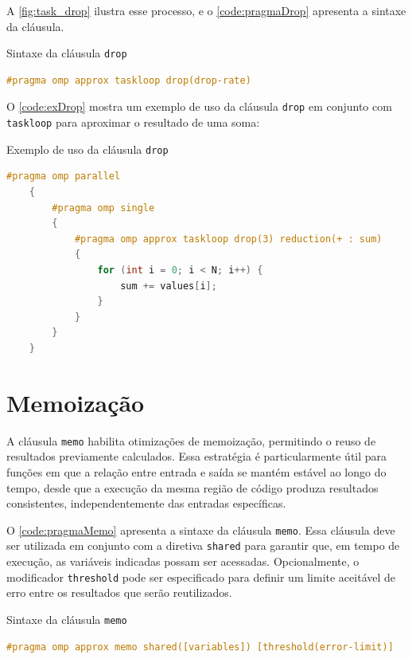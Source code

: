 A \autoref{fig:task_drop} ilustra esse processo, e o \autoref{code:pragmaDrop} apresenta a sintaxe da cláusula.

\begin{sourcecode}[htb]
    \caption{\label{code:pragmaDrop}Sintaxe da cláusula \texttt{drop}}
    \begin{lstlisting}[frame=single, language=C++]
        #pragma omp approx taskloop drop(drop-rate)
    \end{lstlisting}
    \fonte{}
\end{sourcecode}

O \autoref{code:exDrop} mostra um exemplo de uso da cláusula \texttt{drop} em conjunto com \texttt{taskloop} para aproximar o resultado de uma soma:

\begin{sourcecode}[htb]
    \caption{\label{code:exDrop}Exemplo de uso da cláusula \texttt{drop}}
    \begin{lstlisting}[frame=single, language=C++]
    #pragma omp parallel
    {
        #pragma omp single
        {
            #pragma omp approx taskloop drop(3) reduction(+ : sum)
            {
                for (int i = 0; i < N; i++) {
                    sum += values[i];
                }
            }
        }
    }
    \end{lstlisting}
    \fonte{}
\end{sourcecode}

\section{Memoização}\label{subsec:pragmaMemo}

A cláusula \texttt{memo} habilita otimizações de memoização, permitindo o reuso de resultados previamente calculados. Essa estratégia é particularmente útil para funções em que a relação entre entrada e saída se mantém estável ao longo do tempo, desde que a execução da mesma região de código produza resultados consistentes, independentemente das entradas específicas.

O \autoref{code:pragmaMemo} apresenta a sintaxe da cláusula \texttt{memo}. Essa cláusula deve ser utilizada em conjunto com a diretiva \texttt{shared} para garantir que, em tempo de execução, as variáveis indicadas possam ser acessadas. Opcionalmente, o modificador \texttt{threshold} pode ser especificado para definir um limite aceitável de erro entre os resultados que serão reutilizados.

\begin{sourcecode}[htb]
    \caption{\label{code:pragmaMemo}Sintaxe da cláusula \texttt{memo}}
    \begin{lstlisting}[frame=single, language=C++]
        #pragma omp approx memo shared([variables]) [threshold(error-limit)]
    \end{lstlisting}
    \fonte{}
\end{sourcecode}

